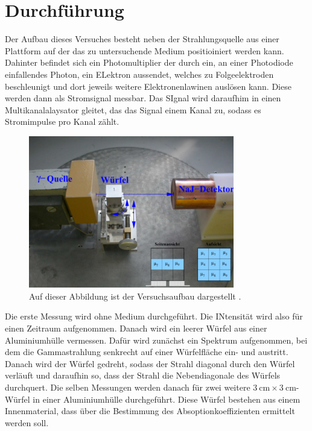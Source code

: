\section{Durchführung}
\label{sec:Durchführung}

Der Aufbau dieses Versuches besteht neben der Strahlungsquelle aus einer Plattform auf der
das zu untersuchende Medium positioiniert werden kann. Dahinter befindet sich ein 
Photomultiplier der durch ein, an einer Photodiode einfallendes Photon, ein ELektron 
aussendet, welches zu Folgeelektroden beschleunigt und dort jeweils weitere Elektronenlawinen 
auslösen kann. Diese werden dann als Stromsignal messbar. Das SIgnal wird daraufhim in 
einen Multikanalalaysator gleitet, das das Signal einem Kanal zu, sodass es Stromimpulse 
pro Kanal zählt.

\begin{figure}
	\centering
	\includegraphics[width=0.8\textwidth]{figure/Aufbau.pdf}
	\caption{Auf dieser Abbildung ist der Versuchsaufbau dargestellt \cite{sample}.}
	\label{abb3}
\end{figure}

Die erste Messung wird ohne Medium durchgeführt. Die INtensität wird also für einen Zeitraum 
aufgenommen. Danach wird ein leerer Würfel aus einer Aluminiumhülle vermessen. Dafür wird 
zunächst ein Spektrum aufgenommen, bei dem die Gammastrahlung senkrecht auf einer 
Würfelfläche ein- und austritt. Danach wird der Würfel gedreht, sodass der Strahl diagonal 
durch den Würfel verläuft und daraufhin so, dass der Strahl die Nebendiagonale des 
Würfels durchquert. Die selben Messungen werden danach für zwei weitere $\SI{3}{\centi\meter} \times \SI{3}{\centi\meter}$-Würfel 
in einer Aluminiumhülle durchgeführt. Diese Würfel bestehen aus einem Innenmaterial, dass 
über die Bestimmung des Absoptionkoeffizienten ermittelt werden soll. \\\\

